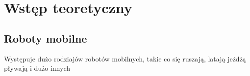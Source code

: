 \chapter{Wstęp teoretyczny}
\section{Roboty mobilne}

Występuje dużo rodziajów robotów mobilnych, takie co się ruszają, latają jeżdżą pływają i dużo innych
